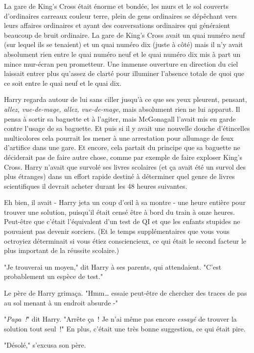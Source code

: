 La gare de King's Cross était énorme et bondée, les murs et le sol couverts d'ordinaires carreaux couleur terre, plein de gens ordinaires se dépêchant vers leurs affaires ordinaires et ayant des conversations ordinaires qui généraient beaucoup de bruit ordinaire. La gare de King's Cross avait un quai numéro neuf (sur lequel ils se tenaient) et un quai numéro dix (juste à côté) mais il n'y avait absolument rien entre le quai numéro neuf et le quai numéro dix mis à part un mince mur-écran peu prometteur. Une immense ouverture en direction du ciel laissait entrer plus qu'assez de clarté pour illuminer l'absence totale de quoi que ce soit entre le quai neuf et le quai dix.

Harry regarda autour de lui sans ciller jusqu'à ce que ses yeux pleurent, pensant, \emph{allez, vue-de-mage, allez, vue-de-mage}, mais absolument rien ne lui apparut. Il pensa à sortir sa baguette et à l'agiter, mais McGonagall l'avait mis en garde contre l'usage de sa baguette. Et puis si il y avait une nouvelle douche d'étincelles multicolores cela pourrait les mener à une arrestation pour allumage de feux d'artifice dans une gare. Et encore, cela partait du principe que sa baguette ne déciderait pas de faire autre chose, comme par exemple de faire exploser King's Cross. Harry n'avait que survolé ses livres scolaires (et ça avait été un survol des plus étranges) dans un effort rapide destiné à déterminer quel genre de livres scientifiques il devrait acheter durant les 48 heures suivantes.

Eh bien, il avait - Harry jeta un coup d'œil à sa montre - une heure entière pour trouver une solution, puisqu'il était censé être à bord du train à onze heures. Peut-être que c'était l'équivalent d'un test de QI et que les enfants stupides ne pouvaient pas devenir sorciers. (Et le temps supplémentaires que vous vous octroyiez déterminait si vous étiez consciencieux, ce qui était le second facteur le plus important de la réussite scolaire.)

"Je trouverai un moyen," dit Harry à ses parents, qui attendaient. "C'est probablement un espèce de test."

Le père de Harry grimaça. "Hmm… essaie peut-être de chercher des traces de pas au sol menant à un endroit absurde -"

"\emph{Papa~!}" dit Harry. "Arrête ça~! Je n'ai même pas encore \emph{essayé} de trouver la solution tout seul~!" En plus, c'était une très bonne suggestion, ce qui était pire.

"Désolé," s'excusa son père.

